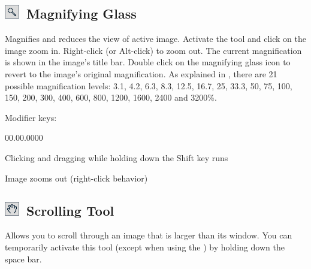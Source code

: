 \subsection[Magnifying Glass]{\noindent \textsf{\protect\includegraphics[bb=0bp 5bp 20bp 20bp,scale=0.6]{images/tools/Glass}}~Magnifying
Glass\label{sec:Magnifying-Glass}}

Magnifies and reduces the view of active image. Activate the tool
and click on the image zoom in. Right-click (or Alt-click)
to zoom out. The current magnification is shown in the image's title
bar. Double click on the magnifying glass icon to revert to the image's
original magnification. As explained in \textsf{},
there are 21 possible magnification levels: 3.1, 4.2, 6.3, 8.3, 12.5,
16.7, 25, 33.3, 50, 75, 100, 150, 200, 300, 400, 600, 800, 1200, 1600,
2400 and 3200\%. 

Modifier keys:
\begin{lyxlist}{00.00.0000}
\item [{\mykeystroke{Shift}}] \noindent Clicking and dragging while holding
down the Shift key runs \textsf{}
\item [{\mykeystroke{Alt}}] \noindent Image zooms out (right-click behavior)
\end{lyxlist}



\subsection[Scrolling Tool]{\noindent \textsf{\protect\includegraphics[bb=0bp 5bp 20bp 20bp,scale=0.6]{images/tools/Hand}}~Scrolling
Tool\label{sec:Scrolling-Tool}}

Allows you to scroll through an image that is larger than its window.
You can temporarily activate this tool (except when using the )
by holding down the space bar.


